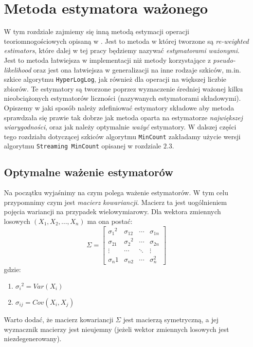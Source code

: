 \chapter{Metoda estymatora ważonego}
\thispagestyle{chapterBeginStyle}

W tym rozdziale zajmiemy się inną metodą estymacji operacji teoriomnogościowych opisaną w \cite{ting}. Jest to metoda w której tworzone są \textit{re-weighted estimators}, które dalej w tej pracy będziemy nazywać \textit{estymatorami ważonymi}. Jest to metoda łatwiejsza w implementacji niż metody korzystające z \textit{pseudo-likelihood} oraz jest ona łatwiejsza w generalizacji na inne rodzaje szkiców, m.in. szkice algorytmu \texttt{HyperLogLog}, jak również dla operacji na większej liczbie zbiorów. Te estymatory są tworzone poprzez wyznaczenie średniej ważonej kilku nieobciążonych estymatorów liczności (nazywanych estymatorami składowymi). Opiszemy w jaki sposób należy zdefiniować estymatory składowe aby metoda sprawdzała się prawie tak dobrze jak metoda oparta na estymatorze \textit{największej wiarygodności}, oraz jak należy optymalnie \textit{ważyć} estymatory. W dalszej części tego rozdziału dotyczącej szkiców algorytmu \texttt{MinCount} zakładamy użycie wersji algorytmu \texttt{Streaming MinCount} opisanej w rozdziale $2.3$.

\section{Optymalne ważenie estymatorów}
Na początku wyjaśnimy na czym polega ważenie estymatorów.
W tym celu przypomnimy czym jest \textit{macierz kowariancji}. Macierz ta jest uogólnieniem pojęcia wariancji na przypadek wielowymiarowy. Dla wektora zmiennych losowych $(X_1, X_2, ..., X_n)$ ma ona postać:
\[
\Sigma =
  \begin{bmatrix}
    {{\sigma}_1}^2 & {\sigma}_{12} & \cdots & {\sigma}_{1n}  \\
    {{\sigma}_21} & {{\sigma}_{2}}^2 & \cdots & {\sigma}_{2n} \\
    \vdots & \cdots & \ddots & \vdots \\
    {{\sigma}_n1} & {{\sigma}_{n2}} & \cdots & {{\sigma}_{n}^2}
  \end{bmatrix}
\]
gdzie:
\begin{enumerate}
    \item ${{\sigma}_i}^2 = Var(X_i)$
    \item ${\sigma}_{ij} = Cov(X_i, X_j)$
\end{enumerate}
Warto dodać, że macierz kowariancji $\Sigma$ jest macierzą symetryczną, a jej wyznacznik macierzy jest nieujemny (jeżeli wektor zmiennych losowych jest niezdegenerowany).
\newline

